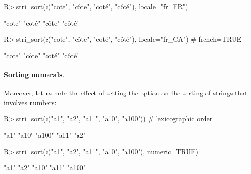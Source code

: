 \documentclass[nojss]{jss}\usepackage[]{graphicx}\usepackage[]{color}
\begin{document}
\begin{Schunk}
\begin{Sinput}
R> stri_sort(c("cote", "côte", "coté", "côté"), locale="fr_FR")
\end{Sinput}
\begin{Soutput}
[1] "cote" "coté" "côte" "côté"
\end{Soutput}
\begin{Sinput}
R> stri_sort(c("cote", "côte", "coté", "côté"), locale="fr_CA") # french=TRUE
\end{Sinput}
\begin{Soutput}
[1] "cote" "côte" "coté" "côté"
\end{Soutput}
\end{Schunk}



\paragraph{Sorting numerals.}
Moreover, let us note the effect of setting the  option on the
sorting of strings that involves numbers:

\begin{Schunk}
\begin{Sinput}
R> stri_sort(c("a1", "a2", "a11", "a10", "a100"))  # lexicographic order
\end{Sinput}
\begin{Soutput}
[1] "a1"   "a10"  "a100" "a11"  "a2"
\end{Soutput}
\begin{Sinput}
R> stri_sort(c("a1", "a2", "a11", "a10", "a100"), numeric=TRUE)
\end{Sinput}
\begin{Soutput}
[1] "a1"   "a2"   "a10"  "a11"  "a100"
\end{Soutput}
\end{Schunk}


\end{document}
